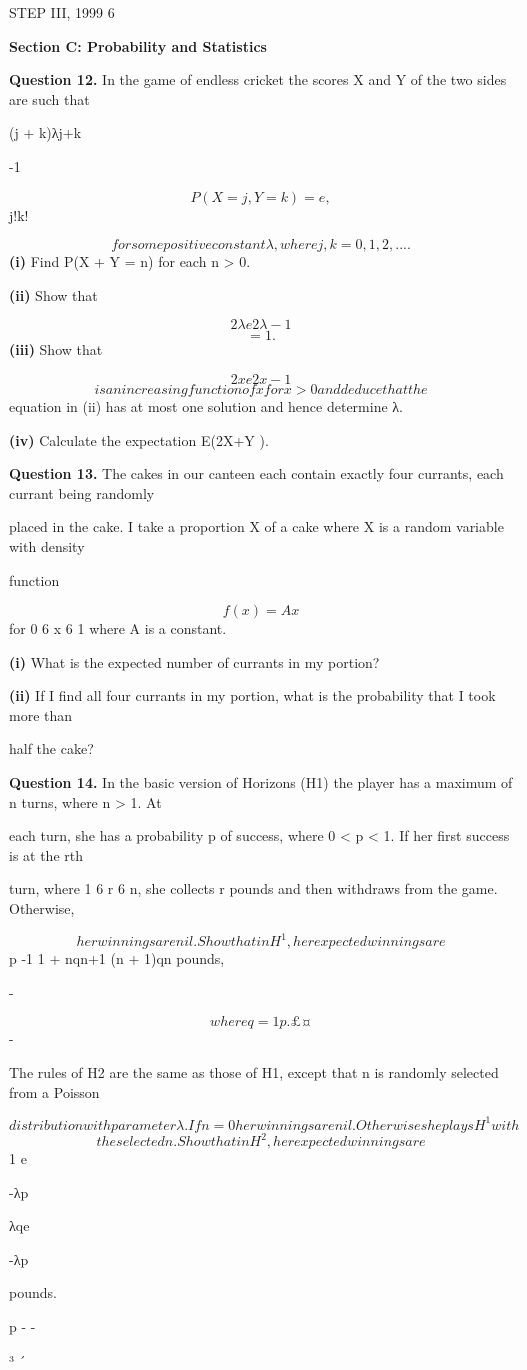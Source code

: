 \documentclass[12pt]{article}
\begin{document}
\begin{flushleft}
STEP III, 1999 6\par
\bigskip\textbf{Section C: Probability and Statistics}\par
\bigskip\textbf{Question 12.} In the game of endless cricket the scores X and Y of the two sides are such that\par
(j + k)λj+k\par
-1\par
\[P(X = j, Y = k) = e ,\]
j!k!\par
\[for some positive constant λ, where j, k = 0, 1, 2, . . . .\]
\textbf{(i)} Find P(X + Y = n) for each n > 0.\par
\textbf{(ii)} Show that\par
\[2λe2λ-1\]
\[= 1.\]
\textbf{(iii)} Show that\par
\[2xe2x-1\]
\[is an increasing function of x for x > 0 and deduce that the\]
equation in (ii) has at most one solution and hence determine λ.\par
\textbf{(iv)} Calculate the expectation E(2X+Y ).\par
\bigskip\textbf{Question 13.} The cakes in our canteen each contain exactly four currants, each currant being randomly\par
placed in the cake. I take a proportion X of a cake where X is a random variable with density\par
function\par
\[f(x) = Ax\]
for 0 6 x 6 1 where A is a constant.\par
\textbf{(i)} What is the expected number of currants in my portion?\par
\textbf{(ii)} If I find all four currants in my portion, what is the probability that I took more than\par
half the cake?\par
\bigskip\textbf{Question 14.} In the basic version of Horizons (H1) the player has a maximum of n turns, where n > 1. At\par
each turn, she has a probability p of success, where 0 < p < 1. If her first success is at the rth\par
turn, where 1 6 r 6 n, she collects r pounds and then withdraws from the game. Otherwise,\par
\[her winnings are nil. Show that in H^1, her expected winnings are\]
p -1 1 + nqn+1 (n + 1)qn pounds,\par
-\par
\[where q = 1 p. \pounds  ¤\]
-\par
The rules of H2 are the same as those of H1, except that n is randomly selected from a Poisson\par
\[distribution with parameter λ. If n = 0 her winnings are nil. Otherwise she plays H^1 with\]
\[the selected n. Show that in H^2, her expected winnings are\]
1 e\par
-λp\par
λqe\par
-λp\par
pounds.\par
p - -\par
³ ´\par
\end{flushleft}
\end{document}
